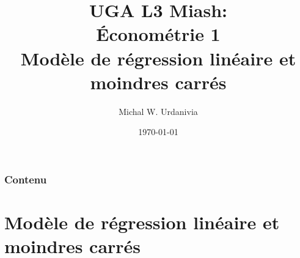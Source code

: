 
 

\title[Regression linéaire]{UGA L3 Miash:\\ \'Econométrie 1\\ \textbf{Modèle de r\'egression linéaire et moindres carrés}}
\date{\today}
\author{Michal W. Urdanivia\inst{*}}




\begin{frame}
\titlepage
\end{frame}

\begin{frame}
\frametitle{Contenu}
\end{frame}

\section{Modèle de régression linéaire et moindres carrés}
\frame{\sectionpage}

